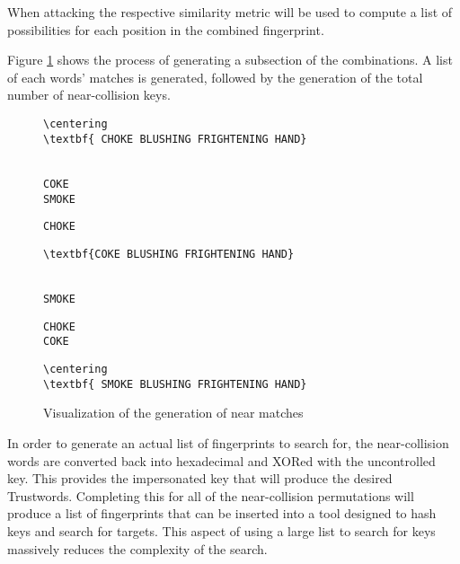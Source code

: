 When attacking the respective similarity metric will be used to compute a list of possibilities for each position in the combined fingerprint.

Figure \ref{fig:nearMatch} shows the process of generating a subsection of the combinations. A list of each words' matches is generated, followed by the generation of the total number of near-collision keys.

\begin{figure}[h!]
    \centering
    \begin{BVerbatim}[commandchars=\\\{\}]
        \centering
\textbf{ CHOKE BLUSHING FRIGHTENING HAND}
    \end{BVerbatim}
    \\
    \verb|COKE                           |
    \\
    \verb|SMOKE                          |
    \\
    \hspace{1cm}



    \verb|CHOKE                          |
    \\
    \begin{BVerbatim}[commandchars=\\\{\}]
\textbf{COKE BLUSHING FRIGHTENING HAND}
    \end{BVerbatim}
    \\
    \verb|SMOKE                          |
    \\
    \hspace{1cm}


    \verb|CHOKE                          |
    \\
    \verb|COKE                           |
    \\
    \begin{BVerbatim}[commandchars=\\\{\}]
        \centering
\textbf{ SMOKE BLUSHING FRIGHTENING HAND}
    \end{BVerbatim}
    \caption{Visualization of the generation of near matches}
    \label{fig:nearMatch}
\end{figure}

In order to generate an actual list of fingerprints to search for, the near-collision words are converted back into hexadecimal and XORed with the uncontrolled key. This provides the impersonated key that will produce the desired Trustwords. Completing this for all of the near-collision permutations will produce a list of fingerprints that can be inserted into a tool designed to hash keys and search for targets. This aspect of using a large list to search for keys massively reduces the complexity of the search.

